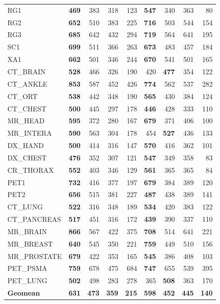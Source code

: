 \documentclass[journal]{IEEEtran}
\begin{document}
\begin{table}[htbp]
\begin{tabular}{l|rrrr|rrrr}
RG1            & \textbf{469} & 383 & 318 & 123 & \textbf{547} & 340 & 363 & 80 \\
RG2            & \textbf{652} & 510 & 383 & 225 & \textbf{716} & 503 & 544 & 154 \\
RG3            & \textbf{685} & 642 & 432 & 294 & \textbf{719} & 564 & 641 & 195 \\
SC1            & \textbf{699} & 511 & 366 & 263 & \textbf{673} & 483 & 457 & 184 \\
XA1            & \textbf{662} & 501 & 346 & 244 & \textbf{670} & 541 & 501 & 165 \\
CT\_BRAIN      & \textbf{528} & 466 & 326 & 190 & 420 & \textbf{477} & 354 & 122 \\
CT\_ANKLE      & \textbf{853} & 587 & 452 & 426 & \textbf{774} & 562 & 537 & 282 \\
CT\_ORT        & \textbf{538} & 442 & 348 & 190 & \textbf{565} & 430 & 384 & 124 \\
CT\_CHEST      & \textbf{500} & 445 & 297 & 178 & \textbf{446} & 428 & 333 & 110 \\
MR\_HEAD       & \textbf{595} & 372 & 280 & 167 & \textbf{679} & 371 & 406 & 100 \\
MR\_INTERA     & \textbf{590} & 563 & 304 & 178 & 454 & \textbf{527} & 436 & 133 \\
DX\_HAND       & \textbf{500} & 414 & 316 & 147 & \textbf{570} & 416 & 362 & 101 \\
DX\_CHEST      & \textbf{476} & 352 & 307 & 121 & \textbf{547} & 349 & 358 & 83 \\
CR\_THORAX     & \textbf{552} & 403 & 346 & 129 & \textbf{561} & 365 & 365 & 84 \\
PET1           & \textbf{732} & 416 & 377 & 197 & \textbf{679} & 384 & 389 & 120 \\
PET2           & \textbf{656} & 515 & 381 & 227 & \textbf{487} & 438 & 389 & 141 \\
CT\_LUNG       & \textbf{522} & 316 & 348 & 189 & \textbf{534} & 420 & 383 & 122 \\
CT\_PANCREAS   & \textbf{517} & 451 & 316 & 172 & \textbf{439} & 390 & 337 & 110 \\
MR\_BRAIN      & \textbf{866} & 567 & 422 & 375 & \textbf{708} & 514 & 641 & 221 \\
MR\_BREAST     & \textbf{640} & 545 & 350 & 221 & \textbf{759} & 449 & 510 & 156 \\
MR\_PROSTATE   & \textbf{679} & 422 & 353 & 165 & \textbf{545} & 386 & 408 & 103 \\
PET\_PSMA      & \textbf{759} & 678 & 475 & 684 & \textbf{747} & 655 & 539 & 395 \\
PET\_LUNG      & \textbf{502} & 498 & 283 & 278 & 365 & \textbf{508} & 363 & 170 \\
\midrule
\textbf{Geomean} & \textbf{631} & \textbf{473} & \textbf{359} & \textbf{215} & \textbf{598} & \textbf{452} & \textbf{445} & \textbf{140} \\
\bottomrule
\end{tabular}
\end{table}
\end{document}
